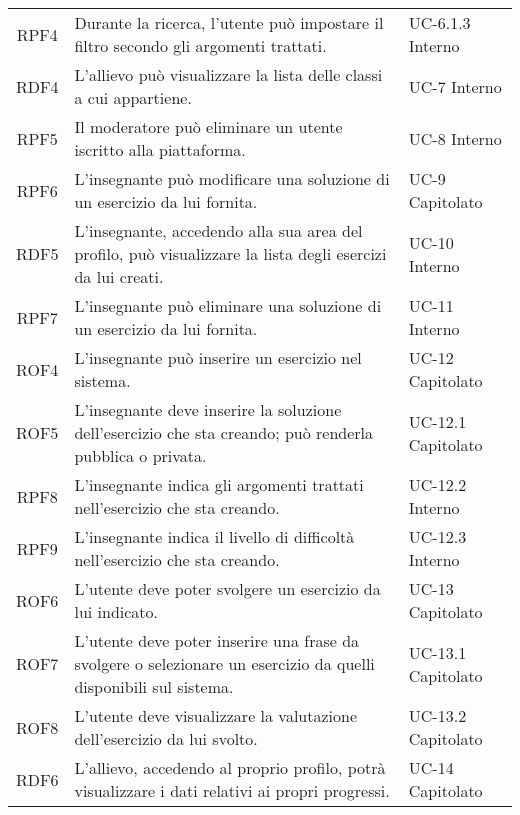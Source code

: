 \begin{tabularx}{\textwidth}{| c | p{10cm} | X |}
		RPF4 & Durante la ricerca, l'utente può impostare il filtro secondo gli argomenti trattati. & UC-6.1.3 \newline Interno\\
		RDF4 & L'allievo può visualizzare la lista delle classi a cui appartiene. & UC-7 \newline Interno\\
		RPF5 & Il moderatore può eliminare un utente iscritto alla piattaforma. & UC-8 \newline Interno\\
		RPF6 & L'insegnante può modificare una soluzione di un esercizio da lui fornita. & UC-9 \newline Capitolato\\
		RDF5 & L'insegnante, accedendo alla sua area del profilo, può visualizzare la lista degli esercizi da lui creati. & UC-10 \newline Interno\\
		RPF7 & L'insegnante può eliminare una soluzione di un esercizio da lui fornita. & UC-11 \newline Interno\\
		ROF4 & L'insegnante può inserire un esercizio nel sistema. & UC-12 \newline Capitolato\\
		ROF5 & L'insegnante deve inserire la soluzione dell'esercizio che sta creando; può renderla pubblica o privata. & UC-12.1 \newline Capitolato\\
		RPF8 & L'insegnante indica gli argomenti trattati nell'esercizio che sta creando. & UC-12.2 \newline Interno\\
		RPF9 & L'insegnante indica il livello di difficoltà nell'esercizio che sta creando. & UC-12.3 \newline Interno\\
		ROF6 & L'utente deve poter svolgere un esercizio da lui indicato. & UC-13 \newline Capitolato\\
		ROF7 & L'utente deve poter inserire una frase da svolgere o selezionare un esercizio da quelli disponibili sul sistema. & UC-13.1 \newline Capitolato\\
		ROF8 & L'utente deve visualizzare la valutazione dell'esercizio da lui svolto. & UC-13.2 \newline Capitolato\\
		RDF6 & L'allievo, accedendo al proprio profilo, potrà visualizzare i dati relativi ai propri progressi. & UC-14 \newline Capitolato\\

\end{tabularx}
